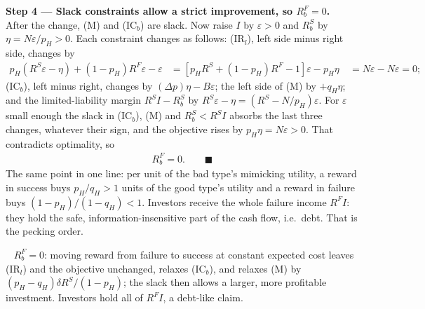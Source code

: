 \documentclass[11pt,a4paper]{article}
\newcommand{\step}[2]{\par\medskip\noindent\textbf{Step #1 --- #2.}~}
\newcommand{\answer}[1]{\par\smallskip\noindent\fbox{\textbf{Answer #1.}}~}
\begin{document}
\step{4}{Slack constraints allow a strict improvement, so $R_b^F=0$} After the change, (M) and (IC$_b$)
are slack. Now raise $I$ by $\varepsilon>0$ and $R_b^S$ by $\eta=N\varepsilon/p_H>0$. Each constraint changes as follows:
(IR$_l$), left side minus right side, changes by
\begin{align}
  p_H(R^S\varepsilon-\eta)+(1-p_H)R^F\varepsilon-\varepsilon
     &= [p_HR^S+(1-p_H)R^F-1]\varepsilon-p_H\eta \nonumber\
     &= N\varepsilon-N\varepsilon = 0; \nonumber
\end{align}
(IC$_b$), left minus right, changes by $(\Delta p)\eta-B\varepsilon$; the left side of (M) by $+q_H\eta$; and the limited-liability margin $R^SI-R_b^S$ by $R^S\varepsilon-\eta=(R^S-N/p_H)\varepsilon$.
For $\varepsilon$ small enough the slack in (IC$_b$), (M) and $R_b^S<R^SI$ absorbs the last three changes, whatever their sign,
and the objective rises by $p_H\eta=N\varepsilon>0$. That contradicts optimality, so
\begin{align}
  R_b^F = 0. \qquad\blacksquare \label{t3e12-RF0}
\end{align}
The same point in one line: per unit of the bad type's mimicking utility, a reward in success buys
$p_H/q_H>1$ units of the good type's utility and a reward in failure buys $(1-p_H)/(1-q_H)<1$. Investors
receive the whole failure income $R^FI$: they hold the safe, information-insensitive part of the cash
flow, i.e.\ debt. That is the pecking order.

\answer{(ii)} $R_b^F=0$: moving reward from failure to success at constant expected cost leaves (IR$_l$) and the objective unchanged, relaxes (IC$_b$), and relaxes (M) by $(p_H-q_H)\delta R^S/(1-p_H)$; the slack then allows a larger, more profitable investment. Investors hold all of $R^FI$, a debt-like claim.
\end{document}
